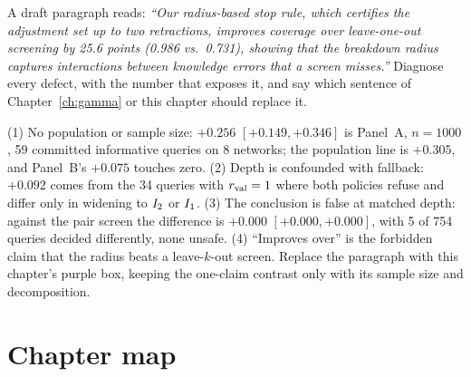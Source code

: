\begin{exercicio}[metodo=diagnosis,conceito=screen-leave-k-out]
A draft paragraph reads: \emph{``Our radius-based stop rule, which certifies the adjustment set up to
two retractions, improves coverage over leave-one-out screening by 25.6 points (0.986 vs.\ 0.731),
showing that the breakdown radius captures interactions between knowledge errors that a screen
misses.''} Diagnose every defect, with the number that exposes it, and say which sentence of
Chapter~\ref{ch:gamma} or this chapter should replace it.
\end{exercicio}
\begin{solucao}
(1) No population or sample size: $+0.256$ $[+0.149, +0.346]$ is Panel~A, $n = 1000$, 59 committed
informative queries on 8 networks; the population line is $+0.305$, and Panel~B's $+0.075$ touches zero.
(2) Depth is confounded with fallback: $+0.092$ comes from the 34 queries with $r_{\mathrm{val}} = 1$ where both
policies refuse and differ only in widening to $I_{2}$ or $I_{1}$. (3) The conclusion is false at
matched depth: against the pair screen the difference is $+0.000$ $[+0.000, +0.000]$, with 5 of 754
queries decided differently, none unsafe. (4) ``Improves over'' is the forbidden claim that the radius
beats a leave-$k$-out screen. Replace the paragraph with this chapter's purple box, keeping the
one-claim contrast only with its sample size and decomposition.
\end{solucao}

\section*{Chapter map}
\begin{center}
\end{center}
